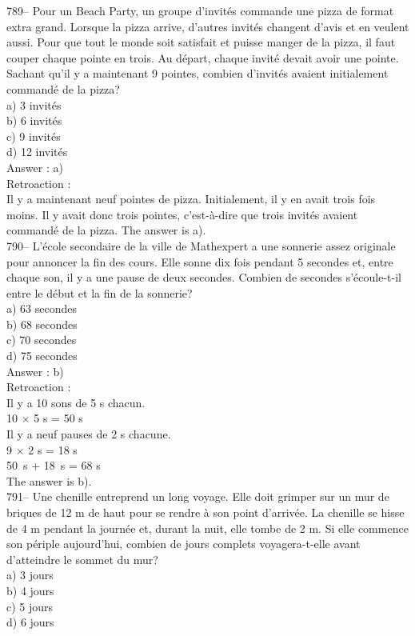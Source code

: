 ﻿\documentclass[letterpaper, 12pt]{article}
\begin{document}
789-- Pour un \og Beach Party\fg , un groupe d'invit\'es commande
une pizza de format extra grand.  Lorsque la pizza arrive, d'autres
invit\'es changent d'avis et en veulent aussi.  Pour que tout le
monde soit satisfait et puisse manger de la pizza, il faut couper
chaque pointe en trois.  Au d\'epart, chaque invit\'e devait avoir
une pointe.  Sachant qu'il y a maintenant 9
pointes, combien d'invit\'es avaient initialement command\'e de la pizza?\\
a) 3 invit\'es\\
b) 6 invit\'es\\
c) 9 invit\'es\\
d) 12 invit\'es\\

Answer : a)\\

Retroaction : \\
Il y a maintenant neuf pointes de pizza.  Initialement, il y en avait trois
fois moins.  Il y avait donc trois pointes, c'est-\`a-dire que trois
invit\'es avaient command\'e de la pizza.  The answer is a).\\

790-- L'\'ecole secondaire de la ville de Mathexpert a une sonnerie assez
originale pour annoncer la fin des cours.  Elle sonne dix fois pendant 5
secondes et, entre chaque son, il y a une pause de deux secondes.  Combien
de secondes s'\'ecoule-t-il entre le d\'ebut et la fin de la sonnerie?\\
a) 63 secondes\\
b) 68 secondes\\
c) 70 secondes\\
d) 75 secondes\\

Answer : b)\\

Retroaction : \\
Il y a 10 sons de 5 s chacun.\\
10 $\times$ 5 s  = 50 s \\
Il y a neuf pauses de 2 s chacune.\\
9 $\times$ 2 s = 18 s \\
50~s + 18~s = 68 s\\
The answer is b).\\

791-- Une chenille entreprend un long voyage.  Elle doit grimper sur un mur
de briques de 12 m de haut pour se rendre \`a son point d'arriv\'ee.  La
chenille se hisse de 4 m pendant la journ\'ee et, durant la nuit, elle tombe
de 2 m.  Si elle commence son p\'eriple aujourd'hui, combien de jours
complets voyagera-t-elle avant d'atteindre le sommet du mur?\\
a) 3 jours\\
b) 4 jours\\
c) 5 jours\\
d) 6 jours\\
\end{document}
